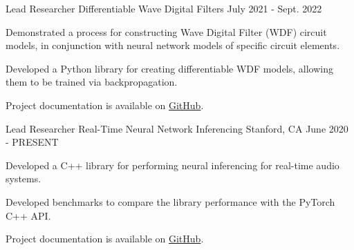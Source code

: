 
\begin{cventries}

  \cventry
    {Lead Researcher} %
    {Differentiable Wave Digital Filters} %
    {} %
    {July 2021 - Sept. 2022} %
    {
      \begin{cvitems} %
        \item {Demonstrated a process for constructing Wave Digital Filter (WDF) circuit models, in conjunction with neural network models of specific circuit elements.}
        \item {Developed a Python library for creating differentiable WDF models, allowing them to be trained via backpropagation.}
        \item {Project documentation is available on \href{https://github.com/jatinchowdhury18/differentiable-wdfs}{GitHub}.}
      \end{cvitems}
    }

  \cventry
    {Lead Researcher} %
    {Real-Time Neural Network Inferencing} %
    {Stanford, CA} %
    {June 2020 - PRESENT} %
    {
      \begin{cvitems} %
        \item {Developed a C++ library for performing neural inferencing for real-time audio systems.}
        \item {Developed benchmarks to compare the library performance with the PyTorch C++ API.}
        \item {Project documentation is available on \href{https://github.com/jatinchowdhury18/RTNeural}{GitHub}.}
      \end{cvitems}
    }


\end{cventries}
